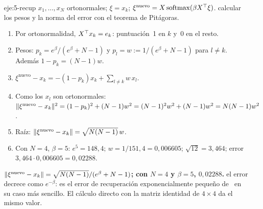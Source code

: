 \begin{solucion}{eje:5-recup}
\datos $x_1,\dots,x_N$ ortonormales; $\xi=x_k$; $\xi^{\text{nuevo}}=X\operatorname{softmax}(\beta X^{\top}\xi)$.
\planteamiento calcular los pesos y la norma del error con el teorema de Pitágoras.
\pasos
\begin{enumerate}[label=\arabic*.]
  \item Por ortonormalidad, $X^{\top} x_k=e_k$: puntuación~1 en $k$ y~0 en el resto.
  \item Pesos: $p_k=e^{\beta}/(e^{\beta}+N-1)$ y $p_l=w:=1/(e^{\beta}+N-1)$ para $l\ne k$. Además $1-p_k=(N-1)w$.
  \item $\xi^{\text{nuevo}}-x_k=-(1-p_k)x_k+\sum_{l\ne k}w\,x_l$.
  \item Como los $x_l$ son ortonormales: $\lVert\xi^{\text{nuevo}}-x_k\rVert^{2}=(1-p_k)^{2}+(N-1)w^{2}=(N-1)^{2}w^{2}+(N-1)w^{2}=N(N-1)w^{2}$.
  \item Raíz: $\lVert\xi^{\text{nuevo}}-x_k\rVert=\sqrt{N(N-1)}\,w$.
  \item Con $N=4$, $\beta=5$: $e^{5}=148{,}4$; $w=1/151{,}4=0{,}006605$; $\sqrt{12}=3{,}464$; error $3{,}464\cdot0{,}006605=0{,}02288$.
\end{enumerate}
\resultado \textbf{$\lVert\xi^{\text{nuevo}}-x_k\rVert=\sqrt{N(N-1)}/(e^{\beta}+N-1)$; con $N=4$ y $\beta=5$, $0{,}02288$.}
\comprobacion el error decrece como $e^{-\beta}$: es el error de recuperación exponencialmente pequeño de~\cite[§2]{ramsauer} en su caso más sencillo. El cálculo directo con la matriz identidad de $4\times4$ da el mismo valor.
\end{solucion}

